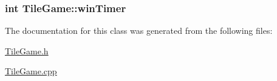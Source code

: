 \hypertarget{classTileGame_a05d9bbf0aebd4822ed518804eeb899fa}{
\subsubsection[{win\-Timer}]{\setlength{\rightskip}{0pt plus 5cm}int Tile\-Game\-::win\-Timer\hspace{0.3cm}{\ttfamily [protected]}}}\label{classTileGame_a05d9bbf0aebd4822ed518804eeb899fa}


The documentation for this class was generated from the following files\-:\begin{DoxyCompactItemize}
\item 
\hyperlink{TileGame_8h}{Tile\-Game.\-h}\item 
\hyperlink{TileGame_8cpp}{Tile\-Game.\-cpp}\end{DoxyCompactItemize}
